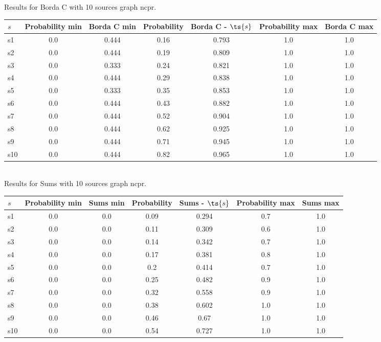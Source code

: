 \documentclass{article}
\begin{document}
\noindent Results for Borda C with 10 sources graph ncpr.

\noindent\begin{tabular}{|l|c|c|c|c|c|c|}
\hline
$s$& Probability min & Borda C min & Probability & Borda C - $\ts{s}$ & Probability max & Borda C max\\
\hline
s1 &0.0 & 0.444 & 0.16 & 0.793 & 1.0 & 1.0\\
\hline
s2 &0.0 & 0.444 & 0.19 & 0.809 & 1.0 & 1.0\\
\hline
s3 &0.0 & 0.333 & 0.24 & 0.821 & 1.0 & 1.0\\
\hline
s4 &0.0 & 0.444 & 0.29 & 0.838 & 1.0 & 1.0\\
\hline
s5 &0.0 & 0.333 & 0.35 & 0.853 & 1.0 & 1.0\\
\hline
s6 &0.0 & 0.444 & 0.43 & 0.882 & 1.0 & 1.0\\
\hline
s7 &0.0 & 0.444 & 0.52 & 0.904 & 1.0 & 1.0\\
\hline
s8 &0.0 & 0.444 & 0.62 & 0.925 & 1.0 & 1.0\\
\hline
s9 &0.0 & 0.444 & 0.71 & 0.945 & 1.0 & 1.0\\
\hline
s10 &0.0 & 0.444 & 0.82 & 0.965 & 1.0 & 1.0\\
\hline
\end{tabular}\\

\noindent Results for Sums with 10 sources graph ncpr.

\noindent\begin{tabular}{|l|c|c|c|c|c|c|}
\hline
$s$& Probability min & Sums min & Probability & Sums - $\ts{s}$ & Probability max & Sums max\\
\hline
s1 &0.0 & 0.0 & 0.09 & 0.294 & 0.7 & 1.0\\
\hline
s2 &0.0 & 0.0 & 0.11 & 0.309 & 0.6 & 1.0\\
\hline
s3 &0.0 & 0.0 & 0.14 & 0.342 & 0.7 & 1.0\\
\hline
s4 &0.0 & 0.0 & 0.17 & 0.381 & 0.8 & 1.0\\
\hline
s5 &0.0 & 0.0 & 0.2 & 0.414 & 0.7 & 1.0\\
\hline
s6 &0.0 & 0.0 & 0.25 & 0.482 & 0.9 & 1.0\\
\hline
s7 &0.0 & 0.0 & 0.32 & 0.558 & 0.9 & 1.0\\
\hline
s8 &0.0 & 0.0 & 0.38 & 0.602 & 1.0 & 1.0\\
\hline
s9 &0.0 & 0.0 & 0.46 & 0.67 & 1.0 & 1.0\\
\hline
s10 &0.0 & 0.0 & 0.54 & 0.727 & 1.0 & 1.0\\
\hline
\end{tabular}\\
\end{document}
